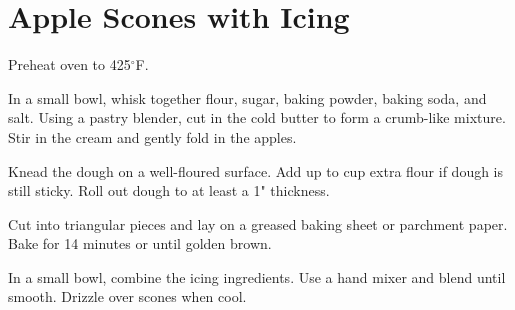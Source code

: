 \section{Apple Scones with Icing}
\begin{recipe}



	Preheat oven to 425$^{\circ}$F.

	In a small bowl, whisk together flour, sugar, baking powder, baking soda, and salt. Using a pastry blender, cut in the cold butter to form a crumb-like mixture. Stir in the cream and gently fold in the apples.

	Knead the dough on a well-floured surface. Add up to  cup extra flour if dough is still sticky. Roll out dough to at least a 1" thickness.

	Cut into triangular pieces and lay on a greased baking sheet or parchment paper. Bake for 14 minutes or until golden brown.


	In a small bowl, combine the icing ingredients. Use a hand mixer and blend until smooth. Drizzle over scones when cool.

\end{recipe}
